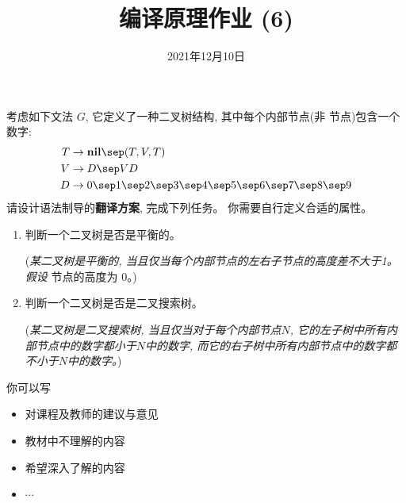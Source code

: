\documentclass[a4paper, justified]{tufte-handout}
\title{编译原理作业 (6)}
\date{2021年12月10日}
\begin{document}
\maketitle
\noplagiarism %
\begin{abstract}
\end{abstract}
\beginrequired

\begin{problem}[\score{20 = 10 + 10}]
  考虑如下文法 $G$, 它定义了一种二叉树结构, 其中每个内部节点(非  节点)包含一个数字:
  \begin{align*}
    T &\to \text{\bf nil} \sep (T, V, T) \\
    V &\to D \sep V D \\
    D &\to 0 \sep 1 \sep 2 \sep 3 \sep 4 \sep 5 \sep 6 \sep 7 \sep 8 \sep 9
  \end{align*}
  请设计语法制导的{\bf 翻译方案}, 完成下列任务。
  你需要自行定义合适的属性。
  \begin{enumerate}[(1)]
    \item 判断一个二叉树是否是平衡的。

    ({\it 某二叉树是平衡的, 当且仅当每个内部节点的左右子节点的高度差不大于1。
        假设 } 节点的高度为 0。)
    \item 判断一个二叉树是否是二叉搜索树。

    ({\it 某二叉树是二叉搜索树, 当且仅当对于每个内部节点$N$,
        它的左子树中所有内部节点中的数字都小于$N$中的数字,
        而它的右子树中所有内部节点中的数字都不小于$N$中的数字。})
  \end{enumerate}
\end{problem}

\begin{solution}
\end{solution}



\beginfb

你可以写
\begin{itemize}
  \item 对课程及教师的建议与意见
  \item 教材中不理解的内容
  \item 希望深入了解的内容
  \item $\cdots$
\end{itemize}
\end{document}
